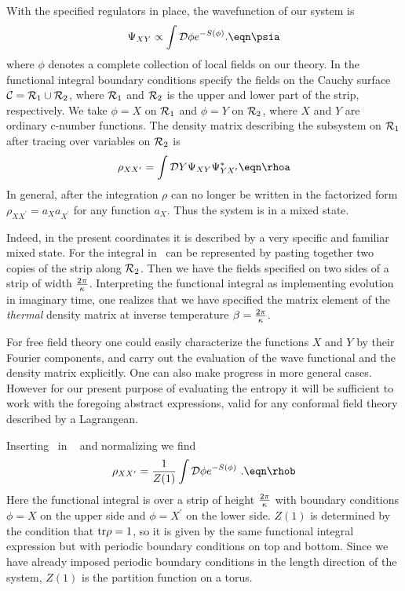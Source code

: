 With the specified regulators in place,
the wavefunction of our system is
$$
\Psi_{XY} \propto \int {\cal D}\phi e^{-S(\phi)}.
\eqn\psia
$$
where $\phi$ denotes a complete
collection of local fields on our theory.
In the functional integral boundary conditions
specify the fields on the Cauchy surface
${\cal C}={\cal R}_1\cup{\cal R}_2$, where ${\cal R}_1$ and
${\cal R}_2$ is the upper and lower part of the strip, respectively.
We take $\phi=X$ on ${\cal R}_1$ and $\phi=Y$ on ${\cal R}_2$,
where $X$ and $Y$ are ordinary c-number functions. The density
matrix describing the subsystem on ${\cal R}_1$ after tracing over
variables on ${\cal R}_2$ is
$$
\rho_{XX^{\prime}}=\int {\cal D} Y \Psi_{XY}\Psi_{YX^{\prime}}^{\ast}
\eqn\rhoa
$$
In general, after the integration
$\rho$ can no longer be written in the factorized form
$\rho_{XX^{\prime}}=a_X a_{X^{\prime}}$ for any function $a_X$.
Thus the system is in a mixed state.

Indeed, in the present coordinates it is described by a
very specific and familiar mixed state.  For the integral in
\rhoa\ can be represented by pasting together two copies of the
strip along ${\cal R}_2$.  Then we have the fields specified on two
sides of a strip of width ${2\pi \over \kappa}$.  Interpreting
the
functional integral as implementing evolution in imaginary time, one
realizes that
we have specified
the matrix element of the {\it thermal\/} density matrix at
inverse temperature $\beta={2\pi \over \kappa}$.



For free field theory one could easily
characterize the functions $X$ and
$Y$ by their Fourier components, and carry out the evaluation
of the wave functional and the density matrix
explicitly.  One can also make progress in more general cases.
However for our
present purpose of evaluating the entropy
it will be sufficient to work with the foregoing abstract
expressions, valid for any conformal field theory
described by a Lagrangean.

Inserting \psia~in \rhoa~ and normalizing we find
$$
\rho_{XX^{\prime}}= {1\over Z(1)}
\int {\cal D}\phi e^{-S(\phi)}~.
\eqn\rhob
$$
Here the functional integral is over a strip of height $2\pi\over\kappa$
with boundary conditions $\phi=X$ on the upper side and $\phi=X^{\prime}$
on the lower side. $Z(1)$ is determined by the condition
that ${\rm tr}\rho =1$, so it is given by the
same functional integral expression but with periodic boundary
conditions on top and bottom.  Since we have already imposed
periodic boundary conditions in the length direction of
the system, $Z(1)$ is the partition function on a torus.

